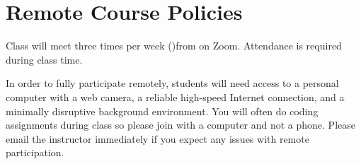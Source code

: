 
\section{\textbf{Remote Course Policies}}
Class will meet three times per week (\mymeetingdays)\space from \mymeetingtimes\space on Zoom. {Attendance is required during class time.}   
 
In order to fully participate remotely, students will need access to a personal computer with a web camera, a reliable high-speed Internet connection, and a minimally disruptive background environment. {You will often do coding assignments during class so please join with a computer and not a phone}. Please email the instructor immediately if you expect any issues with remote participation.